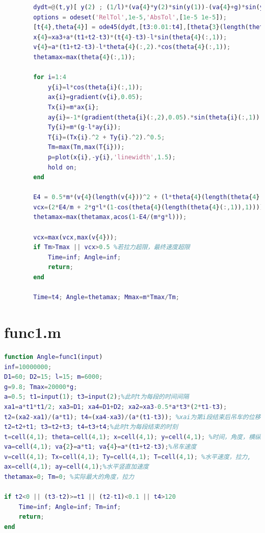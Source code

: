 \documentclass[withoutpreface,bwprint]{cumcmthesis} %
\begin{document}
\begin{appendices}
\begin{lstlisting}[language=matlab]
        %第四段匀速
        dydt=@(t,y)[ y(2) ; (1/l)*(va{4}*y(2)*sin(y(1))-(va{4}+g)*sin(y(1))) ];
        options = odeset('RelTol',1e-5,'AbsTol',[1e-5 1e-5]);
        [t{4},theta{4}] = ode45(dydt,[t3:0.01:t4],[theta{3}(length(theta{3}(:,1)),1) theta{3}(length(theta{3}(:,2)),2)],options);
        x{4}=xa3+a*(t1+t2-t3)*(t{4}-t3)-l*sin(theta{4}(:,1));
        v{4}=a*(t1+t2-t3)-l*theta{4}(:,2).*cos(theta{4}(:,1));
        thetamax=max(theta{4}(:,1));
        
        for i=1:4
            y{i}=l*cos(theta{i}(:,1));
            ax{i}=gradient(v{i},0.05);
            Tx{i}=m*ax{i};
            ay{i}=-1*(gradient(theta{i}(:,2),0.05).*sin(theta{i}(:,1)) + cos(theta{i}(:,1)).*theta{i}(:,2).^2);
            Ty{i}=m*(g-l*ay{i});
            T{i}=(Tx{i}.^2 + Ty{i}.^2).^0.5;
            Tm=max(Tm,max(T{i}));
            p=plot(x{i},-y{i},'linewidth',1.5);
            hold on;
        end
        
        E4 = 0.5*m*(v{4}(length(v{4}))^2 + (l*theta{4}(length(theta{4}(:,2)),2)*sin(theta{4}(length(theta{4}(:,1)),1)))^2);
        vcx=(2*E4/m + 2*g*l*(1-cos(theta{4}(length(theta{4}(:,1)),1))))^0.5;
        thetamax=max(thetamax,acos(1-E4/(m*g*l)));
        
        vcx=max(vcx,max(v{4}));
        if Tm>Tmax || vcx>0.5 %若拉力超限，最终速度超限
            Time=inf; Angle=inf;
            return;
        end
        
        Time=t4; Angle=thetamax; Mmax=m*Tmax/Tm;
     \end{lstlisting}
    \section{func1.m}
    \begin{lstlisting}[language=matlab]
        function Angle=func1(input)
inf=10000000;
D1=60; D2=15; l=15; m=6000;
g=9.8; Tmax=20000*g; 
a=0.5; t1=input(1); t3=input(2);%此时t为每段的时间间隔
xa1=a*t1*t1/2; xa3=D1; xa4=D1+D2; xa2=xa3-0.5*a*t3*(2*t1-t3);
t2=(xa2-xa1)/(a*t1); t4=(xa4-xa3)/(a*(t1-t3)); %xai为第i段结束后吊车的位移
t2=t2+t1; t3=t2+t3; t4=t3+t4;%此时t为每段结束的时刻
t=cell(4,1); theta=cell(4,1); x=cell(4,1); y=cell(4,1); %时间，角度，横纵坐标
va=cell(4,1); va{2}=a*t1; va{4}=a*(t1+t2-t3);%吊车速度
v=cell(4,1); Tx=cell(4,1); Ty=cell(4,1); T=cell(4,1); %水平速度，拉力,
ax=cell(4,1); ay=cell(4,1);%水平竖直加速度
thetamax=0; Tm=0; %实际最大的角度，拉力

if t2<0 || (t3-t2)>=t1 || (t2-t1)<0.1 || t4>120
    Time=inf; Angle=inf; Tm=inf;
    return;
end


\end{lstlisting}
\end{appendices}
\end{document}
